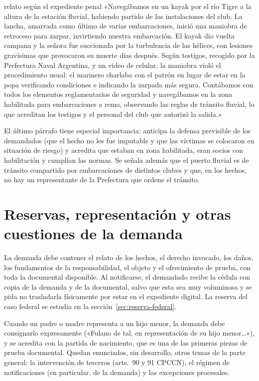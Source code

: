 \documentclass[12pt,oneside]{book}
\begin{document}
\begin{ejemplo}{relato según el expediente penal}
«Navegábamos en un kayak por el río Tigre a la altura de la estación fluvial, habiendo partido de las instalaciones del club. La lancha, amarrada como último de varias embarcaciones, inició una maniobra de retroceso para zarpar, invirtiendo nuestra embarcación. El kayak dio vuelta campana y la señora fue succionada por la turbulencia de las hélices, con lesiones gravísimas que provocaron su muerte días después. Según testigos, recogido por la Prefectura Naval Argentina, y un video de celular, la maniobra violó el procedimiento usual: el marinero charlaba con el patrón en lugar de estar en la popa verificando condiciones e indicando la zarpada más segura. Contábamos con todos los elementos reglamentarios de seguridad y navegábamos en la zona habilitada para embarcaciones a remo, observando las reglas de tránsito fluvial, lo que acreditan los testigos y el personal del club que autorizó la salida.»
\end{ejemplo}

El último párrafo tiene especial importancia: anticipa la defensa previsible de los demandados (que el hecho no les fue imputable y que las víctimas se colocaron en situación de riesgo) y acredita que estaban en zona habilitada, eran socios con habilitación y cumplían las normas. Se señala además que el puerto fluvial es de tránsito compartido por embarcaciones de distintos clubes y que, en los hechos, no hay un representante de la Prefectura que ordene el tránsito.

\section{Reservas, representación y otras cuestiones de la demanda}

La demanda debe contener el relato de los hechos, el derecho invocado, los daños, los fundamentos de la responsabilidad, el objeto y el ofrecimiento de prueba, con toda la documental disponible. Al notificarse, el demandado recibe la cédula con copia de la demanda y de la documental, salvo que esta sea muy voluminosa y se pida no trasladarla físicamente por estar en el expediente digital. La reserva del caso federal se estudia en la sección~\ref{sec:reserva-federal}.

\begin{nota}
Cuando un padre o madre representa a un hijo menor, la demanda debe consignarlo expresamente («Fulano de tal, en representación de su hijo menor\ldots»), y se acredita con la partida de nacimiento, que es una de las primeras piezas de prueba documental. Quedan enunciados, sin desarrollo, otros temas de la parte general: la intervención de terceros (arts.~90 y 91 CPCCN), el régimen de notificaciones (en particular, de la demanda) y las excepciones procesales.
\end{nota}
\end{document}
